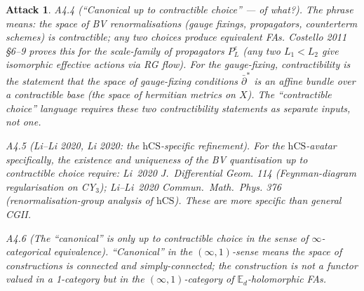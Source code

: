 \documentclass[11pt]{article}
\newtheorem*{attack}{Attack}
\theoremstyle{definition}
\providecommand{\hCS}{\mathrm{hCS}}
\begin{document}
\begin{attack}
\emph{A4.4 (``Canonical up to contractible choice'' — of what?).}
The phrase means: the space of BV renormalisations (gauge fixings,
propagators, counterterm schemes) is contractible; any two choices
produce equivalent FAs. Costello 2011 \S6--9 proves this for the
scale-family of propagators $P_L^\varepsilon$ (any two
$L_1 < L_2$ give isomorphic effective actions via RG flow). For the
gauge-fixing, contractibility is the statement that the space of
gauge-fixing conditions $\bar\partial^*$ is an affine bundle over a
contractible base (the space of hermitian metrics on $X$). The
``contractible choice'' language requires these two contractibility
statements as separate inputs, not one.

\emph{A4.5 (Li--Li 2020, Li 2020: the $\hCS$-specific refinement).}
For the $\hCS$-avatar specifically, the existence and uniqueness of
the BV quantisation up to contractible choice require:
Li~2020 \emph{J.~Differential Geom.} 114 (Feynman-diagram
regularisation on CY$_3$); Li--Li~2020 \emph{Commun.~Math.~Phys.} 376
(renormalisation-group analysis of $\hCS$). These are more specific
than general CGII.

\emph{A4.6 (The ``canonical'' is only up to contractible choice in
the sense of $\infty$-categorical equivalence).} ``Canonical'' in
the $(\infty,1)$-sense means the space of constructions is connected
and simply-connected; the construction is not a functor valued in a
1-category but in the $(\infty,1)$-category of
$\mathbb{E}_d$-holomorphic FAs.
\end{attack}
\end{document}
